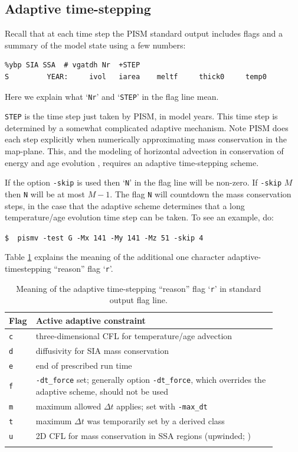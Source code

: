 \documentclass[11pt,final]{amsart}
\begin{document}
\subsection{Adaptive time-stepping} \label{subsect:adapt} Recall that at each time step the PISM standard output includes flags and a summary of the model state using a few numbers:
\begin{verbatim}
%ybp SIA SSA  # vgatdh Nr  +STEP
S         YEAR:     ivol   iarea    meltf     thick0     temp0
\end{verbatim}
Here we explain what `\verb|Nr|' and `\verb|STEP|' in the flag line mean.

\verb|STEP| is the time step just taken by PISM, in model years.  This time step is determined by a somewhat complicated adaptive mechanism.  Note PISM does each step explicitly when numerically approximating mass conservation in the map-plane.  This, and the modeling of horizontal advection in conservation of energy and age evolution \cite{BBL}, requires an adaptive time-stepping scheme.

If the option \verb|-skip| is used then `\verb|N|' in the flag line will be non-zero.  If \verb|-skip| $M$ then \verb|N| will be at most $M-1$.  The flag \verb|N| will countdown the mass conservation steps, in the case that the adaptive scheme determines that a long temperature/age evolution time step can be taken.  To see an example, do:

\verb|$  pismv -test G -Mx 141 -My 141 -Mz 51 -skip 4|

Table \ref{tab:adaptiveflag} explains the meaning of the additional one character adaptive-timestepping ``reason'' flag `\verb|r|'.

\begin{table}[ht]
\caption{Meaning of the adaptive time-stepping ``reason'' flag `\texttt{r}' in standard output flag line.}\label{tab:adaptiveflag}
\begin{tabular}{p{0.05\linewidth}p{0.85\linewidth}}\hline
\textbf{Flag} & \textbf{Active adaptive constraint} \\ \hline
\verb|c| & three-dimensional CFL for temperature/age advection \cite{BBL} \\
\verb|d| & diffusivity for SIA mass conservation \cite{BBL} \\
\verb|e| & end of prescribed run time \\
\verb|f| & \verb|-dt_force| set; generally option \verb|-dt_force|, which overrides the adaptive scheme, should not be used  \\
\verb|m| & maximum allowed $\Delta t$ applies; set with \verb|-max_dt| \\
\verb|t| & maximum $\Delta t$ was temporarily set by a derived class \\
\verb|u| & 2D CFL for mass conservation in SSA regions (upwinded; \cite{BBssasliding})\\
\hline
\normalsize
\end{tabular}
\end{table}
\end{document}

